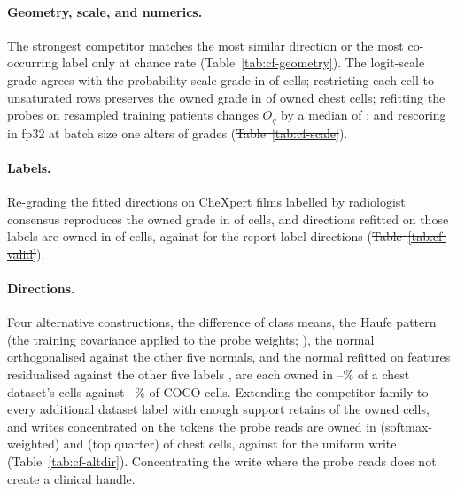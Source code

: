 \documentclass{article}
\makeatletter
\providecommand{\DIFaddtex}[1]{{\protect\color{blue}\uwave{#1}}} %
\providecommand{\DIFdeltex}[1]{{\protect\color{red}\sout{#1}}} %
\providecommand{\DIFaddbegin}{} %
\providecommand{\DIFaddend}{} %
\providecommand{\DIFdelbegin}{} %
\providecommand{\DIFdelend}{} %
\providecommand{\DIFadd}[1]{\texorpdfstring{\DIFaddtex{#1}}{#1}} %
\providecommand{\DIFdel}[1]{\texorpdfstring{\DIFdeltex{#1}}{}} %
\providecommand{\DIFscaledelfig}{0.5}
\newlength{\DIFdelgraphicswidth} %
\newlength{\DIFdelgraphicsheight} %
\providecommand{\DIFaddincludegraphics}[2][]{{\color{blue}\fbox{\DIFOincludegraphics[#1]{#2}}}} %
\providecommand{\DIFdelincludegraphics}[2][]{%
\sbox{\DIFdelgraphicsbox}{\DIFOincludegraphics[#1]{#2}}%
\settoboxwidth{\DIFdelgraphicswidth}{\DIFdelgraphicsbox} %
\settoboxtotalheight{\DIFdelgraphicsheight}{\DIFdelgraphicsbox} %
\scalebox{\DIFscaledelfig}{%
\parbox[b]{\DIFdelgraphicswidth}{\usebox{\DIFdelgraphicsbox}\\[-\baselineskip] \rule{\DIFdelgraphicswidth}{0em}}\llap{\resizebox{\DIFdelgraphicswidth}{\DIFdelgraphicsheight}{%
\setlength{\unitlength}{\DIFdelgraphicswidth}%
\begin{picture}(1,1)%
\thicklines\linethickness{2pt} %
{\color[rgb]{1,0,0}\put(0,0){\framebox(1,1){}}}%
{\color[rgb]{1,0,0}\put(0,0){\line( 1,1){1}}}%
{\color[rgb]{1,0,0}\put(0,1){\line(1,-1){1}}}%
\end{picture}%
}\hspace*{3pt}}} %
} %
\DeclareRobustCommand{\DIFaddbegin}{\DIFOaddbegin \let\includegraphics\DIFaddincludegraphics} %
\DeclareRobustCommand{\DIFaddend}{\DIFOaddend \let\includegraphics\DIFOincludegraphics} %
\DeclareRobustCommand{\DIFdelbegin}{\DIFOdelbegin \let\includegraphics\DIFdelincludegraphics} %
\DeclareRobustCommand{\DIFdelend}{\DIFOaddend \let\includegraphics\DIFOincludegraphics} %
\let\sout@orig\sout %
\renewcommand{\sout}[1]{\ifmmode\text{\sout@orig{\ensuremath{#1}}}\else\sout@orig{#1}\fi} %
\makeatother
\begin{document}
\DIFaddend \paragraph{Geometry, scale, and numerics.} The strongest competitor matches the most similar direction or the most co-occurring label only at chance rate (Table~\ref{tab:cf-geometry}). The logit-scale grade agrees with the probability-scale grade in \cfScaleAgree{} of \cfScaleAgreeN{} cells; restricting each cell to unsaturated rows preserves the owned grade in \cfScaleUnsatGradeKept{} of \cfScaleUnsatGradeN{} owned chest cells; refitting the probes on resampled training patients changes $O_q$ by a median of \cfScaleRefitMedian{}; and rescoring in fp32 at batch size one alters \cfPrecisionGradeChanges{} of \cfPrecisionGradeCells{} grades (\DIFdelbegin \DIFdel{Table~\ref{tab:cf-scale}}\DIFdelend \DIFaddbegin \DIFadd{Appendix~\ref{app:cf-robustness}}\DIFaddend ).

\paragraph{Labels.} Re-grading the fitted directions on \cfValidRows{} CheXpert films labelled by radiologist consensus \citep{irvin2019chexpert} reproduces the owned grade in \cfValidOwnedAgree{} of \cfValidCells{} cells, and directions refitted on those labels are owned in \cfValidfitOwnedExpert{} of \cfValidfitCells{} cells, against \cfValidfitOwnedReport{} for the report-label directions (\DIFdelbegin \DIFdel{Table~\ref{tab:cf-valid}}\DIFdelend \DIFaddbegin \DIFadd{Appendix~\ref{app:cf-robustness}}\DIFaddend ).

\paragraph{Directions.} Four alternative constructions, the difference of class means, the Haufe pattern (the training covariance applied to the probe weights; \citealp{haufe2014interpretation}), the normal orthogonalised against the other five normals, and the normal refitted on features residualised against the other five labels \citep{nicolson2025explaining}, are each owned in \cfAltdirChestPctMin{}--\cfAltdirChestPctMax\% of a chest dataset's cells against \cfAltdirCocoPctMin{}--\cfAltdirCocoPctMax\% of COCO cells. Extending the competitor family to every additional dataset label with enough support retains \cfExtcompRetained{} of the \cfExtcompOwned{} owned cells, and writes concentrated on the tokens the probe reads are owned in \cfTokenwSoftChestOwned{} (softmax-weighted) and \cfTokenwTopqChestOwned{} (top quarter) of \cfTokenwChestCells{} chest cells, against \cfTokenwUniformChestOwned{} for the uniform write (Table~\ref{tab:cf-altdir}). Concentrating the write where the probe reads does not create a clinical handle.
\end{document}
